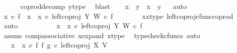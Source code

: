 \begin{isabellebody}
\ \ \ \ \isamarkupfalse%
\ coprod{\isacharunderscore}{\kern0pt}decomp\ y{\isacharunderscore}{\kern0pt}type\ \isamarkupfalse%
\ blast\isanewline
\isanewline
\ \ \isamarkupfalse%
\ {\isachardoublequoteopen}{\isacharparenleft}{\kern0pt}x{}\ {\isacharequal}{\kern0pt}\ y{}{\isacharparenright}{\kern0pt}\ {\isasymand}\ {\isacharparenleft}{\kern0pt}x{}\ {\isacharequal}{\kern0pt}\ y{}{\isacharparenright}{\kern0pt}{\isachardoublequoteclose}\isanewline
\ \ \isamarkupfalse%
{\isacharparenleft}{\kern0pt}auto{\isacharparenright}{\kern0pt}\isanewline
\ \ \ \ \isamarkupfalse%
\ {\isachardoublequoteopen}x{}\ {\isasymcirc}\isactrlsub c\ f\ {\isacharequal}{\kern0pt}\ {\isacharparenleft}{\kern0pt}{\isacharparenleft}{\kern0pt}x{}\ {\isasymamalg}\ x{}{\isacharparenright}{\kern0pt}\ {\isasymcirc}\isactrlsub c\ left{\isacharunderscore}{\kern0pt}coproj\ Y\ W{\isacharparenright}{\kern0pt}\ {\isasymcirc}\isactrlsub c\ f{\isachardoublequoteclose}\isanewline
\ \ \ \ \ \ \isamarkupfalse%
\ x{}{\isacharunderscore}{\kern0pt}x{}{\isacharunderscore}{\kern0pt}type\ left{\isacharunderscore}{\kern0pt}coproj{\isacharunderscore}{\kern0pt}cfunc{\isacharunderscore}{\kern0pt}coprod\ \isamarkupfalse%
\ auto\ \isanewline
\ \ \ \ \isamarkupfalse%
\ \isamarkupfalse%
\ {\isachardoublequoteopen}{\isachardot}{\kern0pt}{\isachardot}{\kern0pt}{\isachardot}{\kern0pt}\ {\isacharequal}{\kern0pt}\ {\isacharparenleft}{\kern0pt}x{}\ {\isasymamalg}\ x{}{\isacharparenright}{\kern0pt}\ {\isasymcirc}\isactrlsub c\ left{\isacharunderscore}{\kern0pt}coproj\ Y\ W\ {\isasymcirc}\isactrlsub c\ f{\isachardoublequoteclose}\isanewline
\ \ \ \ \ \ \isamarkupfalse%
\ assms\ comp{\isacharunderscore}{\kern0pt}associative{}\ x{\isacharunderscore}{\kern0pt}expand\ x{\isacharunderscore}{\kern0pt}type\ \isamarkupfalse%
\ {\isacharparenleft}{\kern0pt}typecheck{\isacharunderscore}{\kern0pt}cfuncs{\isacharcomma}{\kern0pt}\ auto{\isacharparenright}{\kern0pt}\isanewline
\ \ \ \ \isamarkupfalse%
\ \isamarkupfalse%
\ {\isachardoublequoteopen}{\isachardot}{\kern0pt}{\isachardot}{\kern0pt}{\isachardot}{\kern0pt}\ {\isacharequal}{\kern0pt}\ {\isacharparenleft}{\kern0pt}x{}\ {\isasymamalg}\ x{}{\isacharparenright}{\kern0pt}\ {\isasymcirc}\isactrlsub c\ {\isacharparenleft}{\kern0pt}f\ {\isasymbowtie}\isactrlsub f\ g{\isacharparenright}{\kern0pt}\ {\isasymcirc}\isactrlsub c\ left{\isacharunderscore}{\kern0pt}coproj\ X\ V{\isachardoublequoteclose}\isanewline

\end{isabellebody}
